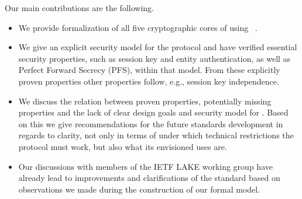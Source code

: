 \documentclass[runningheads,draft,x11names]{llncs}
\begin{document}
Our main contributions are the following.
\begin{itemize}
    \item We provide formalization of all five cryptographic cores of \mEdhoc{}
        using \mTamarin~\cite{DBLP:conf/cav/MeierSCB13}.
    \item We give an explicit security model for the protocol and have verified
        essential security properties, such as session key and entity
        authentication, as well as Perfect Forward Secrecy (PFS), within that
        model.
        From these explicitly proven properties other properties follow, e.g.,
        session key independence.
    \item We discuss the relation between proven properties, potentially missing
        properties and the lack of clear design goals and security model for
        \mEdhoc{}.
        Based on this we give recommendations for the future standards
        development in regards to clarity, not only in terms of under which
        technical restrictions the protocol must work, but also what its
        envisioned uses are.
    \item Our discussions with members of the IETF LAKE working group have already
        lead to improvements and clarifications of the standard \mSpec{} based
        on observations we made during the construction of our formal model.
\end{itemize}

\end{document}
